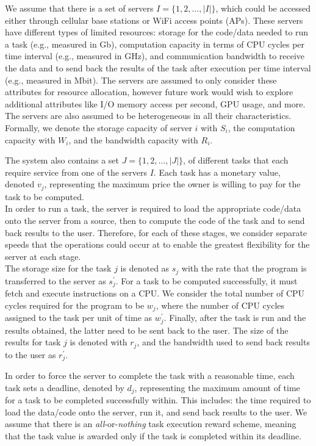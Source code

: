 We assume that there is a set of servers $I = \{1,2,\ldots,\left|I\right|\}$, which could be accessed either through
cellular base stations or WiFi access points (APs). These servers have different types of limited resources:
storage for the code/data needed to run a task (e.g., measured in Gb), computation capacity in terms of CPU cycles per
time interval (e.g., measured in GHz), and communication bandwidth to receive the data and to send back the results
of the task after execution per time interval (e.g., measured in Mbit). The servers are assumed to only consider these
attributes for resource allocation, however future work would wish to explore additional attributes like I/O memory
access per second, GPU usage, and more. The servers are also assumed to be heterogeneous in all their characteristics.
Formally, we denote the storage capacity of server $i$ with $S_i$, the computation capacity with $W_i$, and the
bandwidth capacity with $R_i$.

The system also contains a set $J = \{1,2,\ldots,\left| J \right|\}$, of different tasks that each require service from
one of the servers $I$. Each task has a monetary value, denoted $v_j$, representing the maximum price the owner is
willing to pay for the task to be computed. \\
In order to run a task, the server is required to load the appropriate code/data onto the server from a source, then to
compute the code of the task and to send back results to the user. Therefore, for each of these stages, we consider
separate speeds that the operations could occur at to enable the greatest flexibility for the server at each stage. \\
The storage size for the task $j$ is denoted as $s_j$ with the rate that the program is transferred to the server
as $s^{'}_j$. For a task to be computed successfully, it must fetch and execute instructions on a CPU. We consider the
total number of CPU cycles required for the program to be $w_j$, where the number of CPU cycles assigned to the task
per unit of time as $w^{'}_j$. Finally, after the task is run and the results obtained, the latter need to be sent back
to the user. The size of the results for task $j$ is denoted with $r_j$, and the bandwidth used to send back results to
the user as $r^{'}_j$.

In order to force the server to complete the task with a reasonable time, each task sets a deadline, denoted by $d_j$,
representing the maximum amount of time for a task to be completed successfully within. This includes: the time
required to load the data/code onto the server, run it, and send back results to the user. We assume that there
is an \emph{all}-or-\emph{nothing} task execution reward scheme, meaning that the task value is awarded only if the
task is completed within its deadline.

